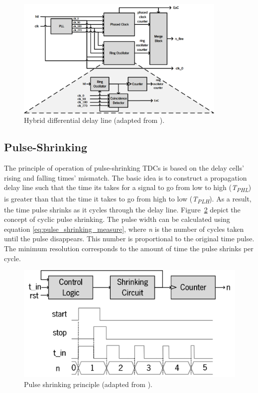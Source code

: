 \begin{figure}[ht!]
	\centering
	\includegraphics[width=0.9\textwidth]{img/02_StateofArt/RO_hybrid.png}
	\caption{Hybrid differential delay line (adapted from \citep{ro_bi_interpolation}).}
	\label{fig:ro_bi_interpolation}
\end{figure}


\subsection{Pulse-Shrinking} %
\label{sub:pulse_shrinking}

The principle of operation of pulse-shrinking \glspl{TDC} is based on the delay cells' rising and falling times' mismatch. The basic idea is to construct a propagation delay line such that the time its takes for a signal to go from low to high (\textit{T\textsubscript{PHL}}) is greater than that the time it takes to go from high to low (\textit{T\textsubscript{PLH}}). As a result, the time pulse shrinks as it cycles through the delay line. Figure~\ref{fig:pulse_shrinking} depict the concept of cyclic pulse shrinking. The pulse width can be calculated using equation \ref{eq:pulse_shrinking_measure}, where \textit{n} is the number of cycles taken until the pulse disappears. This number is proportional to the original time pulse. The minimum resolution corresponds to the amount of time the pulse shrinks per cycle.

\begin{figure}[ht!]
	\centering
	\includegraphics[width=.6\textwidth]{img/02_StateofArt/pulse_shrinking.png}
	\caption{Pulse shrinking principle (adapted from \citep{mattada_ov}).}
	\label{fig:pulse_shrinking}
\end{figure}

